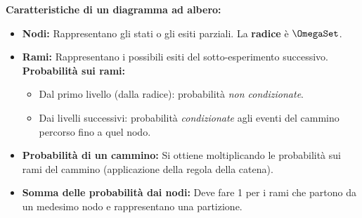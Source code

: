 \textbf{Caratteristiche di un diagramma ad albero:}
\begin{itemize}
    \item \textbf{Nodi:} Rappresentano gli stati o gli esiti parziali. La \textbf{radice} è $\OmegaSet$.
    \item \textbf{Rami:} Rappresentano i possibili esiti del sotto-esperimento successivo.
    \textbf{Probabilità sui rami:}
        \begin{itemize}
            \item Dal primo livello (dalla radice): probabilità \textit{non condizionate}.
            \item Dai livelli successivi: probabilità \textit{condizionate} agli eventi del cammino percorso fino a quel nodo.
        \end{itemize}
    \item \textbf{Probabilità di un cammino:} Si ottiene moltiplicando le probabilità sui rami del cammino (applicazione della regola della catena).
    \item \textbf{Somma delle probabilità dai nodi:} Deve fare 1 per i rami che partono da un medesimo nodo e rappresentano una partizione.
\end{itemize}

